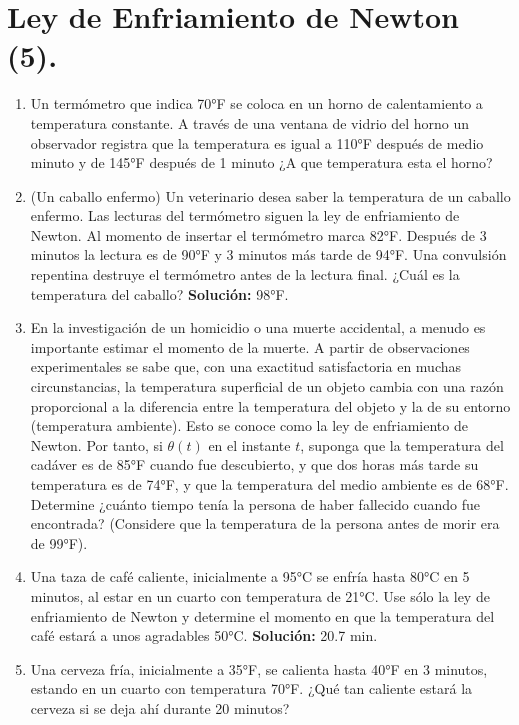 \documentclass[letterpaper,10pt]{memoir}
\begin{document}
\titulo

\section*{Ley de Enfriamiento de Newton (5).} %
\begin{enumerate}
	\item Un termómetro que indica 70°F se coloca en un horno de calentamiento a temperatura constante. A través de una ventana de vidrio del horno un observador registra que la temperatura es igual a 110°F después de medio minuto y de 145°F después de 1 minuto ¿A que temperatura esta el horno?
	\item (Un caballo enfermo) Un veterinario desea saber la temperatura de un caballo enfermo. Las lecturas del termómetro siguen la ley de enfriamiento de Newton. Al momento de insertar el termómetro marca 82°F. Después de 3 minutos la lectura es de 90°F y 3 minutos más tarde de 94°F. Una convulsión repentina destruye el termómetro antes de la lectura final. ¿Cuál es la temperatura del caballo? \textbf{Solución:} 98°F.
	\item En la investigación de un homicidio o una muerte accidental, a menudo es importante estimar el momento de la muerte. A partir de observaciones experimentales se sabe que, con una exactitud satisfactoria en muchas circunstancias, la temperatura superficial de un objeto cambia con una razón proporcional a la diferencia entre la temperatura del objeto y la de su entorno (temperatura ambiente). Esto se conoce como la ley de enfriamiento de Newton. Por tanto, si \(\theta (t)\) en el instante \(t\), suponga que la temperatura del cadáver es de 85°F cuando fue descubierto, y que dos horas más tarde su temperatura es de 74°F, y que la temperatura del medio ambiente es de 68°F.\\
	Determine ¿cuánto tiempo tenía la persona de haber fallecido cuando fue encontrada? (Considere que la temperatura de la persona antes de morir era de 99°F).
	\item Una taza de café caliente, inicialmente a 95°C se enfría hasta 80°C en 5 minutos, al estar en un cuarto con temperatura de 21°C. Use sólo la ley de enfriamiento de Newton y determine el momento en que la temperatura del café estará a unos agradables 50°C. \textbf{Solución:} 20.7 min.
	\item Una cerveza fría, inicialmente a 35°F, se calienta hasta 40°F en 3 minutos, estando en un cuarto con temperatura 70°F. ¿Qué tan caliente estará la cerveza si se deja ahí durante 20 minutos?

\end{enumerate}
\end{document}
